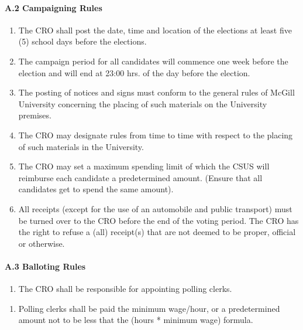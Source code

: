 \paragraph{A.2 Campaigning Rules}\label{a.2-campaigning-rules}

\begin{enumerate}
\def\labelenumi{\arabic{enumi}.}
\item
  The CRO shall post the date, time and location of the elections at
  least five (5) school days before the elections.
\item
  The campaign period for all candidates will commence one week before
  the election and will end at 23:00 hrs. of the day before the
  election.
\item
  The posting of notices and signs must conform to the general rules of
  McGill University concerning the placing of such materials on the
  University premises.
\item
  The CRO may designate rules from time to time with respect to the
  placing of such materials in the University.
\item
  The CRO may set a maximum spending limit of which the CSUS will
  reimburse each candidate a predetermined amount. (Ensure that all
  candidates get to spend the same amount).
\item
  All receipts (except for the use of an automobile and public
  transport) must be turned over to the CRO before the end of the voting
  period. The CRO has the right to refuse a (all) receipt(s) that are
  not deemed to be proper, official or otherwise.
\end{enumerate}

\paragraph{A.3 Balloting Rules}\label{a.3-balloting-rules}

\begin{enumerate}
\def\labelenumi{\arabic{enumi}.}
\tightlist
\item
  The CRO shall be responsible for appointing polling clerks.
\end{enumerate}

\begin{enumerate}
\def\labelenumi{(\alph{enumi})}
\tightlist
\item
  Polling clerks shall be paid the minimum wage/hour, or a predetermined
  amount not to be less that the (hours * minimum wage) formula.
\end{enumerate}

